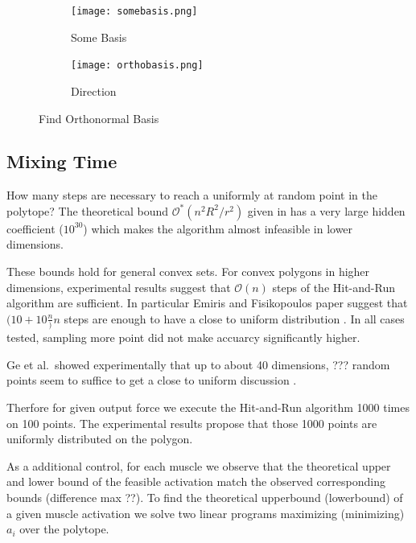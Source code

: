 \begin{figure}
        \centering
        \begin{subfigure}[b]{0.25\textwidth}
                \texttt{[image: somebasis.png]}
      \caption{Some Basis}
      \label{fig_somebasis}
              \end{subfigure} \hspace{0.5cm}
        \begin{subfigure}[b]{0.25\textwidth}
                \texttt{[image: orthobasis.png]}
     \caption{Direction}
      \label{Orthonormal Basis}        
      \end{subfigure}
      \caption{Find Orthonormal Basis}\label{fig_basis} 
\end{figure}


\subsection{Mixing Time}
How many steps are necessary to reach a uniformly at random point in the polytope? The theoretical bound $\mathcal{O}^*(n^2R^2/r^2)$ given in \cite{Lovasz} has a very large hidden coefficient ($10^30$) which makes the algorithm almost infeasible in lower dimensions.

These bounds hold for general convex sets. For convex polygons in higher dimensions, experimental results suggest that $\mathcal{O}(n)$ steps of the Hit-and-Run algorithm are sufficient. In particular Emiris and Fisikopoulos paper suggest that $(10 + 10\frac{n})n$ steps are enough to have a close to uniform distribution \cite{Emiris}. In all cases tested, sampling more point did not make accuarcy significantly higher. 

Ge et al.\ showed experimentally that up to about 40 dimensions, ??? random points seem to suffice to get a close to uniform discussion \cite{Ge}. 

Therfore for given output force we execute the Hit-and-Run algorithm 1000 times on 100 points. The experimental results propose that those 1000 points are uniformly distributed on the polygon.

As a additional control, for each muscle we observe that the theoretical upper and lower bound of the feasible activation match the observed corresponding bounds (difference max ??). To find the theoretical upperbound (lowerbound) of a given muscle activation we solve two linear programs maximizing (minimizing)  $a_i$ over the polytope.



